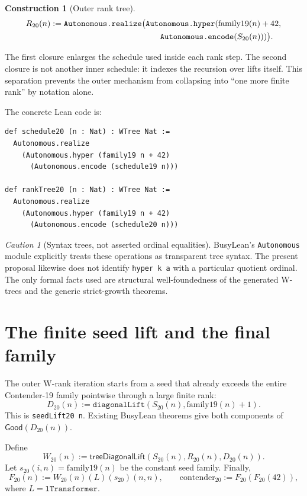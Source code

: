 \documentclass[11pt]{article}
\theoremstyle{definition}
\newtheorem{construction}[theorem]{Construction}
\theoremstyle{remark}
\newtheorem{caution}[theorem]{Caution}
\newcommand{\code}[1]{\texttt{#1}}
\newcommand{\Good}{\mathsf{Good}}
\begin{document}
\begin{construction}[Outer rank tree]
\begin{align*}
R_{20}(n):={}&\code{Autonomous.realize}\bigl(
  \code{Autonomous.hyper}(\mathrm{family19}(n)+42,\\
&\hspace{41mm}\code{Autonomous.encode}(S_{20}(n)))\bigr).
\end{align*}
\end{construction}

The first closure enlarges the schedule used inside each rank step.  The second
closure is not another inner schedule: it indexes the recursion over lifts
itself.  This separation prevents the outer mechanism from collapsing into
``one more finite rank'' by notation alone.

The concrete Lean code is:

\begin{lstlisting}
def schedule20 (n : Nat) : WTree Nat :=
  Autonomous.realize
    (Autonomous.hyper (family19 n + 42)
      (Autonomous.encode (schedule19 n)))

def rankTree20 (n : Nat) : WTree Nat :=
  Autonomous.realize
    (Autonomous.hyper (family19 n + 42)
      (Autonomous.encode (schedule20 n)))
\end{lstlisting}

\begin{caution}[Syntax trees, not asserted ordinal equalities]
BusyLean's \code{Autonomous} module explicitly treats these operations as
transparent tree syntax.  The present proposal likewise does not identify
\code{hyper k a} with a particular quotient ordinal.  The only formal facts
used are structural well-foundedness of the generated W-trees and the generic
strict-growth theorems.
\end{caution}

\section{The finite seed lift and the final family}

The outer W-rank iteration starts from a seed that already exceeds the entire
Contender-19 family pointwise through a large finite rank:
\[
D_{20}(n):=\code{diagonalLift}(S_{20}(n),\mathrm{family19}(n)+1).
\]
This is \code{seedLift20 n}.  Existing BusyLean theorems give both components
of \(\Good(D_{20}(n))\).

Define
\[
W_{20}(n):=\mathsf{treeDiagonalLift}
  (S_{20}(n),R_{20}(n),D_{20}(n)).
\]
Let \(s_{20}(i,n)=\mathrm{family19}(n)\) be the constant seed family.  Finally,
\[
F_{20}(n):=W_{20}(n)(L)(s_{20})(n,n),
\qquad
\mathrm{contender}_{20}:=F_{20}(F_{20}(42)),
\]
where \(L=\code{lTransformer}\).
\end{document}
